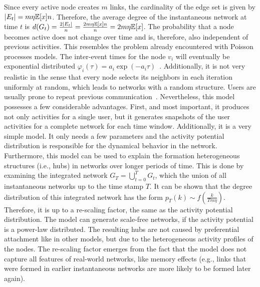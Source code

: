 Since every active node creates \(m\) links, the cardinality of the edge set is given by \(|E_{t}| = m \eta \mathbb{E}[{x}] n\).
Therefore, the average degree of the instantaneous network at time \(t\) is \(d(G_{t}) = \frac{2|E_{t}|}{n} = \frac{2 m \eta \mathbb{E}[{x}] n}{n} = 2 m \eta \mathbb{E}[{x}]\).
The probability that a node becomes active does not change over time and is, therefore, also independent of previous activities.
This resembles the problem already encountered with Poisson processes models.
The inter-event times for the node \(v_{i}\) will eventually be exponential distributed \(\varphi_{i}(\tau) = a_{i} \exp(-a_{i} \tau)\)~\cite{Moinet2016}.
Additionally, it is not very realistic in the sense that every node selects its neighbors in each iteration uniformly at random, which leads to networks with a random structure.
Users are usually prone to repeat previous communication~\cite{Karsai2014}.
Nevertheless, this model possesses a few considerable advantages.
First, and most important, it produces not only activities for a single user, but it generates snapshots of the user activities for a complete network for each time window.
Additionally, it is a very simple model.
It only needs a few parameters and the activity potential distribution is responsible for the dynamical behavior in the network.
Furthermore, this model can be used to explain the formation heterogeneous structures (i.e., hubs) in networks over longer periods of time.
This is done by examining the integrated network \(G_{T} = \bigcup_{t=0}^{T} G_{t}\), which the union of all instantaneous networks up to the time stamp \(T\).
It can be shown that the  degree distribution of this integrated network has the form \(p_{T}(k) \sim f(\frac{k}{T m \eta})\).
Therefore, it is up to a re-scaling factor, the same as the activity potential distribution.
The model can generate scale-free networks, if the activity potential is a power-law distributed.
The resulting hubs are not caused by preferential attachment like in other models, but due to the heterogeneous activity profiles of the nodes.
The re-scaling factor emerges from the fact that the model does not capture all features of real-world networks, like memory effects (e.g., links that were formed in earlier instantaneous networks are more likely to be formed later again).

